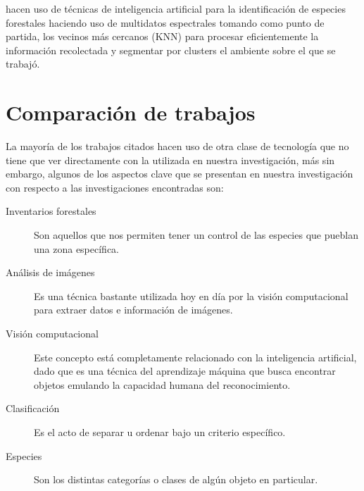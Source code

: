 \citet{rf10} hacen uso de técnicas de inteligencia artificial para la identificación  de especies forestales haciendo uso de multidatos espectrales tomando como punto de partida, los vecinos más cercanos (KNN) para procesar eficientemente la información recolectada y segmentar por clusters el ambiente sobre el que se trabajó.

\pagebreak
 
\section{Comparación de trabajos}
La mayoría de los trabajos citados hacen uso de otra clase de tecnología que no tiene que ver directamente con la utilizada en nuestra investigación, más sin embargo, algunos de los aspectos clave que se presentan en nuestra investigación con respecto a las investigaciones encontradas son:

\begin{description}
\item[Inventarios forestales]{ Son aquellos que nos permiten tener un control de las especies que pueblan una zona específica.}
\end{description}

\begin{description}
\item[Análisis de imágenes]{Es una técnica bastante utilizada hoy en día por la visión computacional para extraer datos e información de imágenes.}
\end{description}

\begin{description}
\item[Visión computacional]{Este concepto está completamente relacionado con la inteligencia artificial, dado que es una  técnica del aprendizaje máquina que busca encontrar objetos emulando la capacidad humana del reconocimiento.}
\end{description}

\begin{description}
\item[Clasificación]{Es el acto de separar u ordenar bajo un criterio específico.}
\end{description}

\begin{description}
\item[Especies]{Son los distintas categorías o  clases de algún objeto en particular.}
\end{description}

